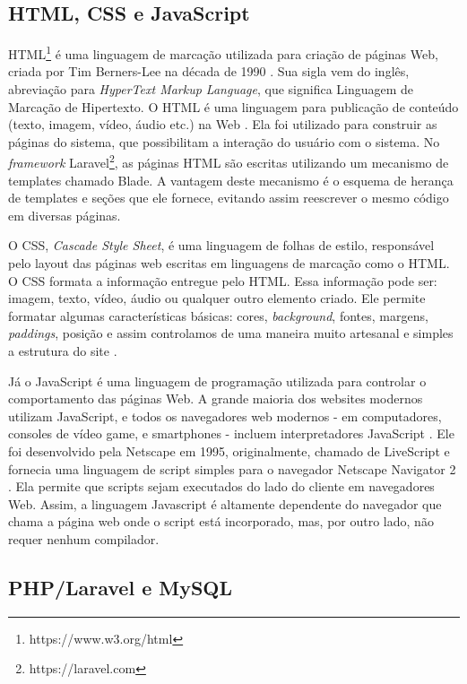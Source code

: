 \subsection{HTML, CSS e JavaScript}

HTML\footnote{https://www.w3.org/html} é uma linguagem de marcação utilizada para criação de páginas Web, criada por Tim Berners-Lee na década de 1990 \citep{Raggett:1998:RH:275611}. Sua sigla vem do inglês, abreviação para \textit{HyperText Markup Language}, que significa Linguagem de Marcação de Hipertexto. O HTML é uma linguagem para publicação de conteúdo (texto, imagem, vídeo, áudio etc.) na Web \citep{w3cHTML}. Ela foi utilizado para construir as páginas do sistema, que possibilitam a interação do usuário com o sistema. No \textit{framework} Laravel\footnote{https://laravel.com}, as páginas HTML são escritas utilizando um mecanismo de templates chamado Blade. A vantagem deste mecanismo é o esquema de herança de templates e seções que ele fornece, evitando assim reescrever o mesmo código em diversas páginas.

O CSS, \textit{Cascade Style Sheet}, é uma linguagem de folhas de estilo, responsável pelo layout das páginas web escritas em linguagens de marcação como o HTML. O CSS formata a informação entregue pelo HTML. Essa informação pode ser: imagem, texto, vídeo, áudio ou qualquer outro elemento criado. Ele permite formatar algumas características básicas: cores, \textit{background}, fontes, margens, \textit{paddings}, posição e assim controlamos de uma maneira muito
artesanal e simples a estrutura do site \citep{w3cCSS}.

Já o JavaScript é uma linguagem de programação utilizada para controlar o comportamento das páginas Web. A grande maioria dos websites modernos utilizam JavaScript, e todos os navegadores web modernos - em computadores, consoles de vídeo game, e smartphones - incluem interpretadores JavaScript \citep{flanagan2011javascript}. Ele foi desenvolvido pela Netscape em 1995, originalmente, chamado de LiveScript e fornecia uma linguagem de script simples para o navegador Netscape Navigator 2 \citep{ccmJS}. Ela permite que scripts sejam executados do lado do cliente em navegadores Web. Assim, a linguagem Javascript é altamente dependente do navegador que chama a página web onde o script está incorporado, mas, por outro lado, não requer nenhum compilador.

\subsection{PHP/Laravel e MySQL}

